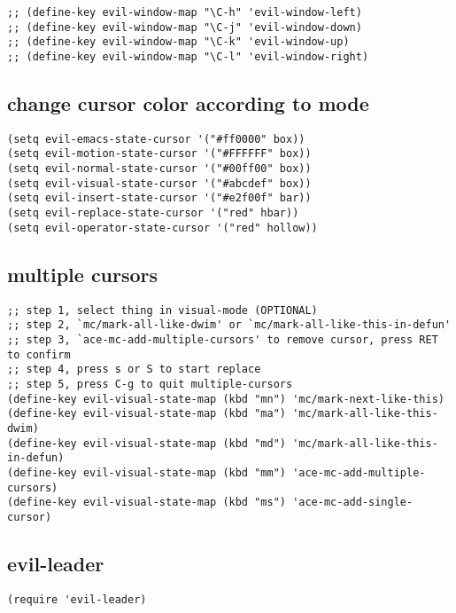 \documentclass[11pt]{article}
\begin{document}
\begin{verbatim}
;; (define-key evil-window-map "\C-h" 'evil-window-left)
;; (define-key evil-window-map "\C-j" 'evil-window-down)
;; (define-key evil-window-map "\C-k" 'evil-window-up)
;; (define-key evil-window-map "\C-l" 'evil-window-right)
\end{verbatim}



\subsection*{change cursor color according to mode}
\label{sec:orgc248a18}

\begin{verbatim}
(setq evil-emacs-state-cursor '("#ff0000" box))
(setq evil-motion-state-cursor '("#FFFFFF" box))
(setq evil-normal-state-cursor '("#00ff00" box))
(setq evil-visual-state-cursor '("#abcdef" box))
(setq evil-insert-state-cursor '("#e2f00f" bar))
(setq evil-replace-state-cursor '("red" hbar))
(setq evil-operator-state-cursor '("red" hollow))
\end{verbatim}

\subsection*{multiple cursors}
\label{sec:org8c29ac4}

\begin{verbatim}
;; step 1, select thing in visual-mode (OPTIONAL)
;; step 2, `mc/mark-all-like-dwim' or `mc/mark-all-like-this-in-defun'
;; step 3, `ace-mc-add-multiple-cursors' to remove cursor, press RET to confirm
;; step 4, press s or S to start replace
;; step 5, press C-g to quit multiple-cursors
(define-key evil-visual-state-map (kbd "mn") 'mc/mark-next-like-this)
(define-key evil-visual-state-map (kbd "ma") 'mc/mark-all-like-this-dwim)
(define-key evil-visual-state-map (kbd "md") 'mc/mark-all-like-this-in-defun)
(define-key evil-visual-state-map (kbd "mm") 'ace-mc-add-multiple-cursors)
(define-key evil-visual-state-map (kbd "ms") 'ace-mc-add-single-cursor)
\end{verbatim}

\subsection*{evil-leader}
\label{sec:orge7ae41b}

\begin{verbatim}
(require 'evil-leader)
\end{verbatim}
\end{document}
